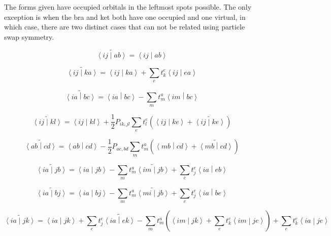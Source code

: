 \documentclass{article}
\begin{document}
The forms given have occupied orbitals in the leftmost spots possible. The only exception is when the bra and ket both have one occupied and one virtual, in which case, there are two distinct cases that can not be related using particle swap symmetry.

\begin{equation}
  \tilde{\left<ij\middle|ab\right>} = \left<ij\middle|ab\right>
\end{equation}

\begin{equation}
  \tilde{\left<ij\middle|ka\right>} = \left<ij\middle|ka\right> + \sum_et_k^e\left<ij\middle|ea\right>
\end{equation}

\begin{equation}
  \tilde{\left<ia\middle|bc\right>} = \left<ia\middle|bc\right> - \sum_mt_m^a\left<im\middle|bc\right>
\end{equation}

\begin{equation}
  \tilde{\left<ij\middle|kl\right>} = \left<ij\middle|kl\right> + \frac{1}{2}P_{ik,jl}\sum_{e}t_l^e\left(\left<ij\middle|ke\right> + \tilde{\left<ij\middle|ke\right>}\right)
\end{equation}

\begin{equation}
  \tilde{\left<ab\middle|cd\right>} = \left<ab\middle|cd\right> - \frac{1}{2}P_{ac,bd}\sum_mt_m^a\left(\left<mb\middle|cd\right> + \tilde{\left<mb\middle|cd\right>}\right)
\end{equation}

\begin{equation}
  \tilde{\left<ia\middle|jb\right>} = \left<ia\middle|jb\right> - \sum_mt_m^a\tilde{\left<im\middle|jb\right>} + \sum_et_j^e\left<ia\middle|eb\right>
\end{equation}

\begin{equation}
  \tilde{\left<ia\middle|bj\right>} = \left<ia\middle|bj\right> - \sum_mt_m^a\tilde{\left<mi\middle|jb\right>} + \sum_et_j^e\left<ia\middle|be\right>
\end{equation}

\begin{equation}
  \tilde{\left<ia\middle|jk\right>} = \left<ia\middle|jk\right> + \sum_et_j^e\tilde{\left<ia\middle|ek\right>} - \sum_mt_m^a\left(\left<im\middle|jk\right> + \sum_et_k^e\left<im\middle|je\right>\right) + \sum_et_k^e\left<ia\middle|je\right>
\end{equation}
\end{document}
